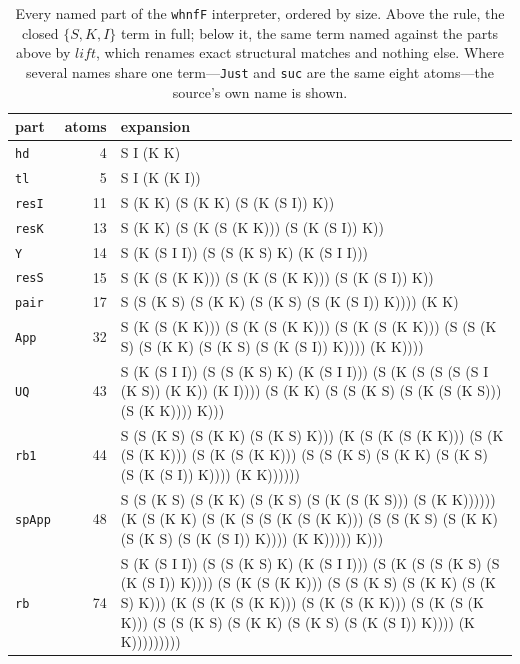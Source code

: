 \documentclass[english,submission,code=tt]{programming}
\begin{document}
\begin{table}[htb!]
\caption{Every named part of the \texttt{whnfF} interpreter, ordered by 
size.  Above the rule, the closed $\{S,K,I\}$ term in full; below it, 
the same term named against the parts above by $\mathit{lift}$, which
renames exact structural matches and nothing else.  Where several names
share one term---\texttt{Just} and \texttt{suc} are the same eight
atoms---the source's own name is shown.}\label{tab:whnfF}
\centering\footnotesize
\begin{tabular}{@{}l r >{\raggedright\arraybackslash\ttfamily}p{\dimexpr\linewidth-78pt\relax}@{}}
\toprule
\textrm{part} & \textrm{atoms} & \textrm{expansion} \\
\midrule
\texttt{hd}     &   4 & S I (K K) \\
\texttt{tl}     &   5 & S I (K (K I)) \\
\texttt{resI}   &  11 & S (K K) (S (K K) (S (K (S I)) K)) \\
\texttt{resK}   &  13 & S (K K) (S (K (S (K K))) (S (K (S I)) K)) \\
\texttt{Y}      &  14 & S (K (S I I)) (S (S (K S) K) (K (S I I))) \\
\texttt{resS}   &  15 & S (K (S (K K))) (S (K (S (K K))) (S (K (S I)) K)) \\
\texttt{pair}   &  17 & S (S (K S) (S (K K) (S (K S) (S (K (S I)) K)))) (K K) \\
\texttt{App}    &  32 & S (K (S (K K))) (S (K (S (K K))) (S (K (S (K K))) (S (S (K S) (S (K K) (S (K S) (S (K (S I)) K)))) (K K)))) \\
\texttt{UQ}     &  43 & S (K (S I I)) (S (S (K S) K) (K (S I I))) (S (K (S (S (S (S I (K S)) (K K)) (K I)))) (S (K K) (S (S (K S) (S (K (S (K S))) (S (K K)))) K))) \\
\texttt{rb1}    &  44 & S (S (K S) (S (K K) (S (K S) K))) (K (S (K (S (K K))) (S (K (S (K K))) (S (K (S (K K))) (S (S (K S) (S (K K) (S (K S) (S (K (S I)) K)))) (K K)))))) \\
\texttt{spApp}  &  48 & S (S (K S) (S (K K) (S (K S) (S (K (S (K S))) (S (K K)))))) (K (S (K K) (S (K (S (S (K (S (K K))) (S (S (K S) (S (K K) (S (K S) (S (K (S I)) K)))) (K K))))) K))) \\
\texttt{rb}     &  74 & S (K (S I I)) (S (S (K S) K) (K (S I I))) (S (K (S (S (K S) (S (K (S I)) K)))) (S (K (S (K K))) (S (S (K S) (S (K K) (S (K S) K))) (K (S (K (S (K K))) (S (K (S (K K))) (S (K (S (K K))) (S (S (K S) (S (K K) (S (K S) (S (K (S I)) K)))) (K K))))))))) \\

\end{tabular}
\end{table}
\end{document}
